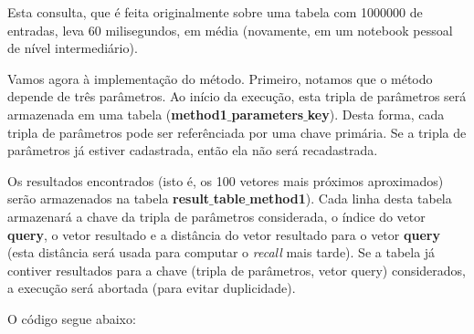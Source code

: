 \documentclass[a4paper,12pt,titlepage]{scrartcl}
\begin{document}
Esta consulta, que é feita originalmente sobre uma tabela com 1000000 de entradas, leva 60 milisegundos, em média (novamente, em um notebook pessoal de nível intermediário). 

Vamos agora à implementação do método. Primeiro, notamos que o método depende de três parâmetros. Ao início da execução, esta tripla de parâmetros será armazenada em uma tabela (\textbf{method1$\_$parameters$\_$key}). Desta forma, cada tripla de parâmetros pode ser referênciada por uma chave primária. Se a tripla de parâmetros já estiver cadastrada, então ela não será recadastrada.

Os resultados encontrados (isto é, os 100 vetores mais próximos aproximados) serão armazenados na tabela \textbf{result$\_$table$\_$method1}). Cada linha desta tabela armazenará a chave da tripla de parâmetros considerada, o índice do vetor \textbf{query}, o vetor resultado e a distância do vetor resultado para o vetor \textbf{query} (esta distância será usada para computar o \emph{recall} mais tarde). Se a tabela já contiver resultados para a chave (tripla de parâmetros, vetor query) considerados, a execução será abortada (para evitar duplicidade). 

O código segue abaixo:\\
\end{document}
